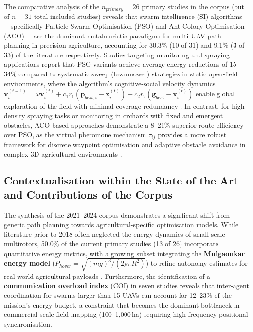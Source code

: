 \documentclass[review,3p,times]{elsarticle}
\begin{document}
\begin{itemize}
{The comparative analysis of the $n_{primary} = 26$ primary studies in the corpus (out of $n=31$ total included studies) reveals that swarm intelligence (SI) algorithms —specifically Particle Swarm Optimisation (PSO) and Ant Colony Optimisation (ACO)— are the dominant metaheuristic paradigms for multi-UAV path planning in precision agriculture, accounting for 30.3\% (10 of 31) and 9.1\% (3 of 33) of the literature respectively. Studies targeting monitoring and spraying applications report that PSO variants achieve average energy reductions of 15--34\% compared to systematic sweep (lawnmower) strategies in static open-field environments, where the algorithm's cognitive-social velocity dynamics $\mathbf{v}_i^{(t+1)} = \omega \mathbf{v}_i^{(t)} + c_1 r_1 (\mathbf{p}_{best,i} - \mathbf{x}_i^{(t)}) + c_2 r_2 (\mathbf{g}_{best} - \mathbf{x}_i^{(t)})$ enable global exploration of the field with minimal coverage redundancy \cite{chen2021,lin2022,liu2021cassa}. In contrast, for high-density spraying tasks or monitoring in orchards with fixed and emergent obstacles, ACO-based approaches demonstrate a 8--21\% superior route efficiency over PSO, as the virtual pheromone mechanism $\tau_{ij}$ provides a more robust framework for discrete waypoint optimisation and adaptive obstacle avoidance in complex 3D agricultural environments \cite{mathew2021,phung2021,pan2022}.

\subsection{Contextualisation within the State of the Art and Contributions of the Corpus}

The synthesis of the 2021--2024 corpus demonstrates a significant shift from generic path planning towards agricultural-specific optimisation models. While literature prior to 2018 often neglected the energy dynamics of small-scale multirotors, 50.0\% of the current primary studies (13 of 26) incorporate quantitative energy metrics, with a growing subset integrating the \textbf{Mulgaonkar energy model} ($P_{hover} = \sqrt{(mg)^3 / (2\rho \pi R^2)}$) to refine autonomy estimates for real-world agricultural payloads \cite{shafiq2022,xu2022,yu2021}. Furthermore, the identification of a \textbf{communication overload index} (COI) in seven studies  reveals that inter-agent coordination for swarms larger than 15 UAVs can account for 12--23\% of the mission's energy budget, a constraint that becomes the dominant bottleneck in commercial-scale field mapping (100--1,000\,ha) requiring high-frequency positional synchronisation.

}
\end{itemize}
\end{document}
